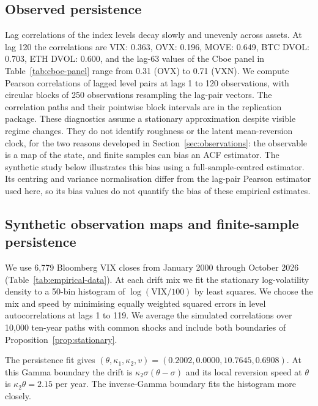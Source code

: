 \subsection{Observed persistence}
\label{sec:empirical-acf}
Lag correlations of the index levels decay slowly and unevenly across assets.
At lag 120 the correlations are VIX: 0.363, OVX: 0.196, MOVE: 0.649, BTC DVOL: 0.703, ETH DVOL: 0.600, and the lag-63 values of the Cboe panel in
Table~\ref{tab:cboe-panel} range from 0.31 (OVX) to 0.71 (VXN). We compute Pearson correlations of lagged level pairs at lags 1 to 120
observations, with circular blocks of 250 observations resampling the lag-pair
vectors. The correlation paths and their pointwise block intervals are in the
replication package. These diagnostics assume a stationary approximation despite visible regime
changes. They do not identify roughness or the latent mean-reversion clock, for the
two reasons developed in Section~\ref{sec:observations}: the observable is a map of
the state, and finite samples can bias an ACF estimator. The synthetic study below
illustrates this bias using a full-sample-centred estimator. Its centring and
variance normalisation differ from the lag-pair Pearson estimator used here,
so its bias values do not quantify the bias of these empirical estimates.

\subsection{Synthetic observation maps and finite-sample persistence}
\label{sec:synthetic-observation-acf}
We use 6,779 Bloomberg VIX closes from January 2000 through October 2026
(Table~\ref{tab:empirical-data}). At each drift mix we fit the stationary log-volatility
density to a 50-bin histogram of $\log(\mathrm{VIX}/100)$ by least squares.
We choose the mix and speed by minimising equally weighted squared errors in level autocorrelations
at lags 1 to 119. We average the simulated correlations over
10,000 ten-year paths with common shocks and include both boundaries of Proposition~\ref{prop:stationary}.

The persistence fit gives $(\theta,\kappa_1,\kappa_2,v)=(0.2002,0.0000,10.7645,0.6908)$.
At this Gamma boundary the drift is $\kappa_2\sigma(\theta-\sigma)$ and its local reversion speed
at $\theta$ is $\kappa_2\theta=2.15$ per year. The inverse-Gamma boundary fits the histogram more closely.

